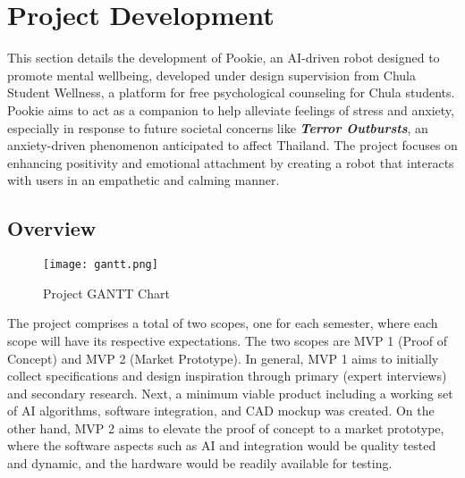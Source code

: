 \section{Project Development}

This section details the development of Pookie, an AI-driven robot designed to promote mental wellbeing, developed under design supervision from Chula Student Wellness, a platform for free psychological counseling for Chula students. Pookie aims to act as a companion to help alleviate feelings of stress and anxiety, especially in response to future societal concerns like \textbf{\textit{Terror Outbursts}}, an anxiety-driven phenomenon anticipated to affect Thailand. The project focuses on enhancing positivity and emotional attachment by creating a robot that interacts with users in an empathetic and calming manner.

\subsection{Overview}
\begin{figure}[!htb]
    \centering
    \captionsetup{justification=centering}
    \texttt{[image: gantt.png]}
    \caption{Project GANTT Chart}
    \label{fig:gantt}
\end{figure}

The project comprises a total of two scopes, one for each semester, where each scope will have its respective expectations. The two scopes are MVP 1 (Proof of Concept) and MVP 2 (Market Prototype). In general, MVP 1 aims to initially collect specifications and design inspiration through primary (expert interviews) and secondary research. Next, a minimum viable product including a working set of AI algorithms, software integration, and CAD mockup was created. On the other hand, MVP 2 aims to elevate the proof of concept to a market prototype, where the software aspects such as AI and integration would be quality tested and dynamic, and the hardware would be readily available for testing.

